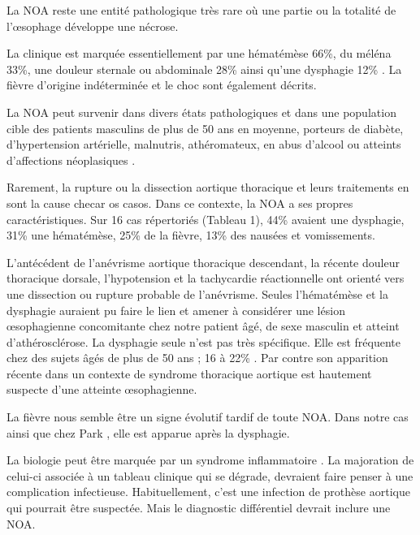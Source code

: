 \documentclass[./tfe.tex]{subfiles}
\begin{document}
La NOA reste une entité pathologique très rare où une partie ou la totalité de l’œsophage développe une nécrose\cite{gurvits_acute_2007, abdullah_clinical_2019}.

La clinique est marquée essentiellement par une hématémèse 66\%, du méléna 33\%, une douleur sternale ou abdominale 28\% ainsi qu’une dysphagie 12\% \cite{abdullah_clinical_2019}. La fièvre d'origine indéterminée et le choc sont également décrits.

La NOA peut survenir dans divers états pathologiques et dans une population cible des patients masculins de plus de 50 ans en moyenne, porteurs de diabète, d’hypertension artérielle, malnutris, athéromateux, en abus d’alcool ou atteints d’affections néoplasiques \cite{gurvits_acute_2007, abdullah_clinical_2019}.

Rarement, la rupture ou la dissection aortique thoracique et leurs traitements en sont la cause \cite{gurvits_acute_2007, iuamoto_necrose_2015, lacombe_acute_1971}  checar os casos.
Dans ce contexte, la NOA a ses propres caractéristiques. Sur 16 cas répertoriés (Tableau 1), 44\% avaient une dysphagie, 31\% une hématémèse, 25\% de la fièvre, 13\% des nausées et vomissements.

L’antécédent de l’anévrisme aortique thoracique descendant, la récente douleur thoracique dorsale, l’hypotension et la tachycardie réactionnelle ont orienté vers une dissection ou rupture probable de l’anévrisme. Seules l’hématémèse et la dysphagie auraient pu faire le lien et amener à considérer une lésion œsophagienne concomitante chez notre patient âgé, de sexe masculin et atteint d’athérosclérose. La dysphagie seule n’est pas très spécifique. Elle est fréquente chez des sujets âgés de plus de 50 ans ; 16 à 22\% \cite{patel_hard_2020}. Par contre son apparition récente dans un contexte de syndrome thoracique aortique est hautement suspecte d’une atteinte œsophagienne.

La fièvre nous semble être un signe évolutif tardif de toute NOA. Dans notre cas ainsi que chez Park \cite{park_ischemic_2004}, elle est apparue après la dysphagie.

La biologie peut être marquée par un syndrome inflammatoire \cite{gurvits_acute_2007, chiesa_aorto-oesophageal_2010, czerny_new_2014}. La majoration de celui-ci associée à un tableau clinique qui se dégrade, devraient faire penser à une complication infectieuse. Habituellement, c’est une infection de prothèse aortique qui pourrait être suspectée. Mais le diagnostic différentiel devrait inclure une NOA.
\end{document}
